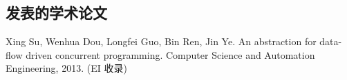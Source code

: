 \begin{resume}

  \section*{发表的学术论文} %

  \begin{enumerate}[{[}1{]}]
  \addtolength{\itemsep}{-.36\baselineskip}%
  \item Xing Su, Wenhua Dou, Longfei Guo, Bin Ren, Jin Ye. An abstraction for
    data-flow driven concurrent programming. Computer Science and Automation Engineering,
    2013. (EI 收录)
  \end{enumerate}

\end{resume}
